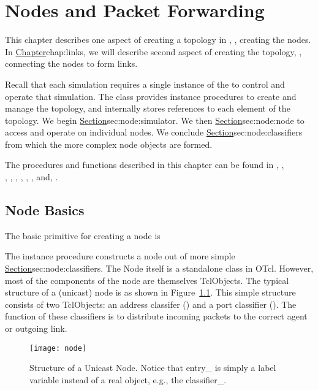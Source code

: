 \chapter{Nodes and Packet Forwarding}
\label{chap:nodes}

This chapter describes one aspect of creating a topology in \ns,
\ie, creating the nodes.
In 
\href{the next chapter}{Chapter}{chap:links},
we will describe second aspect of creating the topology,
\ie, connecting the nodes to form links.

Recall that each simulation requires a single instance of the
 to control and operate
that simulation. 
The class provides instance procedures to create and manage the topology,
and internally stores references to each element of the topology.
We begin 
\href{by describing the procedures in the class Simulator}{%
        Section}{sec:node:simulator}.
We then
\href{describe the instance procedures in the class Node}{%
        Section}{sec:node:node}
to access and operate on individual nodes.
We conclude
\href{with detailed descriptions of the Classifier}{%
        Section}{sec:node:classifiers}
from which the more complex node objects are formed.

The procedures and functions described in this chapter can be found in
, , \\
, , 
, ,
, , 
and, .

\section{Node Basics}
\label{sec:node:simulator}

The basic primitive for creating a node is
The instance procedure  constructs
a node out of more simple
\href{classifier objects}{Section}{sec:node:classifiers}.
The Node itself is a standalone class in OTcl.
However, most of the components of the node are themselves TclObjects.
The typical structure of a (unicast) 
node is as shown in Figure~\ref{fig:node:unicast}.  This simple structure
consists of two TclObjects:  an address classifer () and
a port classifier ().  The function of these classifiers
is to distribute incoming packets to the correct agent or outgoing link.
\begin{figure}[tb]
  \centerline{\texttt{[image: node]}}
  \caption{Structure of a Unicast Node.  Notice that entry\_ is simply a 
   label variable instead of a real object, e.g., the classifier\_.}
  \label{fig:node:unicast}
\end{figure}

